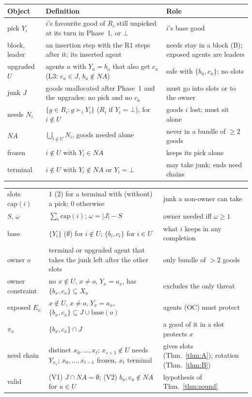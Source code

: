\documentclass[runningheads,11pt]{llncs}
\newcommand{\NA}{\mathit{NA}}
\newcommand{\capa}{\mathrm{cap}}
\newcommand{\base}{\mathrm{base}}
\newcommand{\none}{\bot}
\newcommand{\st}{\mathrel{:}}
\begin{document}
\noindent\begin{tabular}{@{}>{\raggedright\arraybackslash}p{}>{\raggedright\arraybackslash}p{}>{\raggedright\arraybackslash}p{}@{}}
\toprule
Object & Definition & Role \\
\midrule
pick $Y_i$ & $i$'s favourite good of $R_i$ still unpicked at its turn in Phase~1, or $\none$ & $i$'s base good \\
block, leader & an insertion step with the R1 steps after it; its inserted agent & needs stay in a block (B); exposed agents are leaders \\
upgraded $U$ & agents $u$ with $Y_u=b_u$ that also get $c_u$ (L3: $c_u\in J$, $b_u\notin\NA$) & safe with $\{b_u,c_u\}$; no slots \\
junk $J$ & goods unallocated after Phase~1 and the upgrades: no pick and no $c_u$ & must go into slots or to the owner \\
needs $N_i$ & $\{g\in R_i\st g\succ_i Y_i\}$ ($R_i$ if $Y_i=\none$), for $i\notin U$ & goods $i$ lost; must sit alone \\
$\NA$ & $\bigcup_{i\notin U}N_i$, goods needed alone & never in a bundle of $\ge2$ goods \\
frozen & $i\notin U$ with $Y_i\in\NA$ & keeps its pick alone \\
terminal & $i\notin U$ with $Y_i\notin\NA$ or $Y_i=\none$ & may take junk; ends need chains \\
\bottomrule
\end{tabular}

\noindent\begin{tabular}{@{}>{\raggedright\arraybackslash}p{}>{\raggedright\arraybackslash}p{}>{\raggedright\arraybackslash}p{}@{}}
\toprule
slots $\capa(i)$ & $1$ ($2$) for a terminal with (without) a pick; $0$ otherwise & junk a non-owner can take \\
$S$, $\omega$ & $\sum_i\capa(i)$; $\omega=|J|-S$ & owner needed iff $\omega\ge1$ \\
base & $\{Y_i\}$ ($\emptyset$) for $i\notin U$; $\{b_i,c_i\}$ for $i\in U$ & what $i$ keeps in any completion \\
owner $o$ & terminal or upgraded agent that takes the junk left after the other slots & only bundle of $>2$ goods \\
owner constraint & no $x\notin U$, $x\ne o$, $Y_x=a_x$, has $\{b_x,c_x\}\subseteq X_o$ & excludes the only threat \\
exposed $E_o$ & $x\notin U$, $x\ne o$, $Y_x=a_x$, $\{b_x,c_x\}\subseteq J\cup\base(o)$ & agents (OC) must protect \\
$\pi_x$ & $\{b_x,c_x\}\cap J$ & a good of it in a slot protects $x$ \\
need chain & distinct $x_0,\dots,x_t$; $x_{s+1}\notin U$ needs $Y_{x_s}$; $x_0,\dots,x_{t-1}$ frozen, $x_t$ terminal & gives slots (Thm.~\ref{thm:A}); rotation (Thm.~\ref{thm:B}) \\
valid & (V1) $J\cap\NA=\emptyset$; (V2) $b_u,c_u\notin\NA$ for $u\in U$ & hypothesis of Thm.~\ref{thm:sound} \\
\bottomrule
\end{tabular}
\end{document}
